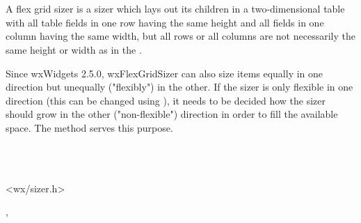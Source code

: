 
\section{}\label{wxflexgridsizer}

A flex grid sizer is a sizer which lays out its children in a two-dimensional
table with all table fields in one row having the same
height and all fields in one column having the same width, but all
rows or all columns are not necessarily the same height or width as in
the .

Since wxWidgets 2.5.0, wxFlexGridSizer can also size items equally in one
direction but unequally ("flexibly") in the other. If the sizer is only
flexible in one direction (this can be changed using
),
it needs to be decided how the sizer should grow in the other ("non-flexible")
direction in order to fill the available space. The
 method
serves this purpose.


\\
\\


<wx/sizer.h>


, 


\label{wxflexgridsizerwxflexgridsizer}



